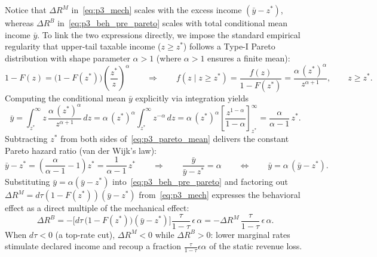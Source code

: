 Notice that $\Delta R^M$ in~\eqref{eq:p3_mech} scales with the excess income $(\bar{y} - z^*)$, whereas $\Delta R^B$ in~\eqref{eq:p3_beh_pre_pareto} scales with total conditional mean income $\bar{y}$. To link the two expressions directly, we impose the standard empirical regularity that upper-tail taxable income ($z \ge z^*$) follows a Type-I Pareto distribution with shape parameter $\alpha > 1$ (where $\alpha > 1$ ensures a finite mean):
\begin{equation}
1 - F(z) = \big(1 - F(z^*)\big)\left(\frac{z^*}{z}\right)^\alpha
\qquad\Longrightarrow\qquad
f(z \mid z \ge z^*) = \frac{f(z)}{1 - F(z^*)} = \frac{\alpha\,(z^*)^\alpha}{z^{\alpha + 1}}, \qquad z \ge z^*.
\end{equation}
Computing the conditional mean $\bar{y}$ explicitly via integration yields
\begin{equation}
\bar{y} = \int_{z^*}^\infty z\,\frac{\alpha\,(z^*)^\alpha}{z^{\alpha + 1}}\,dz
= \alpha\,(z^*)^\alpha \int_{z^*}^\infty z^{-\alpha}\,dz
= \alpha\,(z^*)^\alpha \left[\frac{z^{1-\alpha}}{1-\alpha}\right]_{z^*}^\infty
= \frac{\alpha}{\alpha - 1}\,z^*.
\label{eq:p3_pareto_mean}
\end{equation}
Subtracting $z^*$ from both sides of~\eqref{eq:p3_pareto_mean} delivers the constant Pareto hazard ratio (van der Wijk's law):
\begin{equation}
\bar{y} - z^* = \left(\frac{\alpha}{\alpha - 1} - 1\right)z^* = \frac{1}{\alpha - 1}\,z^*
\qquad\Longrightarrow\qquad
\frac{\bar{y}}{\bar{y} - z^*} = \alpha
\qquad\Longleftrightarrow\qquad
\bar{y} = \alpha\,(\bar{y} - z^*).
\label{eq:p3_van_der_wijk}
\end{equation}
Substituting $\bar{y} = \alpha(\bar{y} - z^*)$ into~\eqref{eq:p3_beh_pre_pareto} and factoring out $\Delta R^M = d\tau(1 - F(z^*))(\bar{y} - z^*)$ from~\eqref{eq:p3_mech} expresses the behavioral effect as a direct multiple of the mechanical effect:
\begin{equation}
\Delta R^B = -\Big[d\tau\,\big(1 - F(z^*)\big)(\bar{y} - z^*)\Big]\frac{\tau}{1-\tau}\,\epsilon\,\alpha
= -\Delta R^M\,\frac{\tau}{1-\tau}\,\epsilon\,\alpha.
\label{eq:p3_beh}
\end{equation}
When $d\tau < 0$ (a top-rate cut), $\Delta R^M < 0$ while $\Delta R^B > 0$: lower marginal rates stimulate declared income and recoup a fraction $\frac{\tau}{1-\tau}\epsilon\alpha$ of the static revenue loss.

